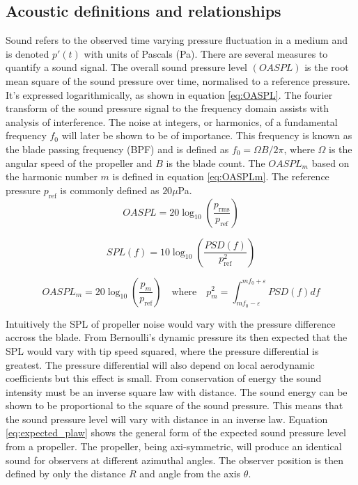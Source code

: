 \documentclass[12pt,a4paper]{article}
\begin{document}
\subsection{Acoustic definitions and relationships}
Sound refers to the observed time varying pressure fluctuation in a medium and is denoted $p'(t)$ with units of Pascals (Pa).
There are several measures to quantify a sound signal.
The overall sound pressure level $(OASPL)$ is the root mean square of the sound pressure over time, normalised to a reference pressure.
It's expressed logarithmically, as shown in equation \ref{eq:OASPL}.
The fourier transform of the sound pressure signal to the frequency domain assists with analysis of interference.
The noise at integers, or harmonics, of a fundamental frequency $f_0$ will later be shown to be of importance.
This frequency is known as the blade passing frequency (BPF) and is defined as $f_0 = \Omega B/ 2\pi$, where $\Omega$ is the angular speed of the propeller and $B$ is the blade count.
The $OASPL_m$ based on the harmonic number $m$ is defined in equation \ref{eq:OASPLm}.
The reference pressure $p_\text{ref}$ is commonly defined as $20 \mu$Pa.
\begin{equation}
    OASPL = 20 \log_{10} \left( \frac{p_\text{rms}}{p_\text{ref}} \right) \label{eq:OASPL}
\end{equation}

\begin{equation}
    SPL(f) = 10 \log_{10} \left( \frac{PSD(f)}{p^2_\text{ref}} \right) \label{eq:SPL_f}
\end{equation}

\begin{equation}
    OASPL_m = 20 \log_{10} \left( \frac{ p_m }{p_\text{ref}} \right) \label{eq:OASPLm} \quad \text{where} \quad p_m^2 = \int^{m f_0 + \varepsilon}_{m f_0 - \varepsilon} PSD(f) df
\end{equation}


Intuitively the SPL of propeller noise would vary with the pressure difference accross the blade.
From Bernoulli's dynamic pressure its then expected that the SPL would vary with tip speed squared, where the pressure differential is greatest.
The pressure differential will also depend on local aerodynamic coefficients but this effect is small.
From conservation of energy the sound intensity must be an inverse square law with distance.
The sound energy can be shown to be proportional to the square of the sound pressure.
This means that the sound pressure level will vary with distance in an inverse law.
Equation \ref{eq:expected_plaw} shows the general form of the expected sound pressure level from a propeller.
The propeller, being axi-symmetric, will produce an identical sound for observers at different azimuthal angles.
The observer position is then defined by only the distance $R$ and angle from the axis $\theta$.
\end{document}
